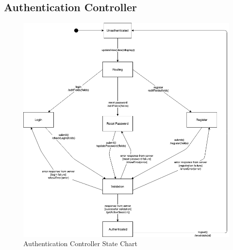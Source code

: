 \documentclass[]{article}
\begin{document}
\subsection{Authentication Controller}
\label{sub:auth_controller_state}
\begin{figure}[H]
\begin{center}
\includegraphics[width=1\textwidth]{D3/images/AuthController.png}
\end{center}
\caption{Authentication Controller State Chart}
\label{fig:Authentication Controller State Chart}
\end{figure}
\end{document}
